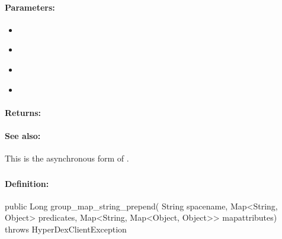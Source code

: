 \paragraph{Parameters:}
\begin{itemize}[noitemsep]
\item {}\\

\item {}\\

\item {}\\

\item {}\\

\end{itemize}

\paragraph{Returns:}


\paragraph{See also:}  This is the asynchronous form of .

\pagebreak
\subsubsection{}
\label{api:java:group_map_string_prepend}


\paragraph{Definition:}
\begin{javacode}
public Long group_map_string_prepend(
        String spacename,
        Map<String, Object> predicates,
        Map<String, Map<Object, Object>> mapattributes) throws HyperDexClientException
\end{javacode}

